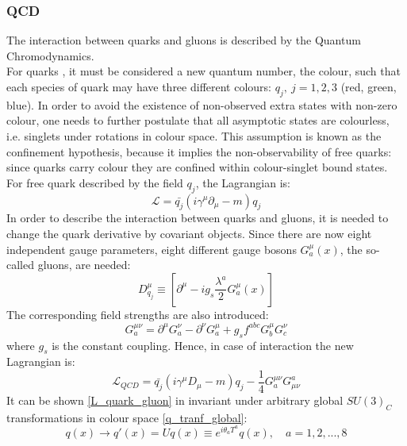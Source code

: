 \subsubsection{QCD}\label{QCD}
The interaction between quarks and gluons is described by the Quantum Chromodynamics. \\
For quarks \cite{QCD}, it must be considered a new quantum number, the colour, such that each species of quark may have three different colours: $q_{j},\ j = 1, 2, 3$ (red, green, blue). In order to avoid the existence of non-observed extra states with non-zero colour, one needs to further postulate that all asymptotic states are colourless, i.e. singlets under rotations in colour space. This assumption is known as the confinement hypothesis, because it implies the non-observability of free quarks: since quarks carry colour they are confined within colour-singlet bound states. \\
For free quark described by the field $q_{j}$, the Lagrangian is:
\begin{equation}
\mathcal{L} = \bar{q_{j}}(i\gamma^{\mu}\partial_{\mu} - m)q_{j}
\label{L_quark}
\end{equation}
In order to describe the  interaction between quarks and gluons, it is needed to change the quark derivative by covariant objects. Since there are now eight independent gauge parameters, eight different gauge bosons $G^{\mu}_{a}(x)$, the so-called gluons, are needed:
\begin{equation}
D^{\mu}_{q_{j}} \equiv [\partial^{\mu}- ig_{s}\frac{\lambda^{a}}{2}G^{\mu}_{a}(x)]
\label{D_covariante_qcd}
\end{equation}
The corresponding field strengths are also introduced:
\begin{equation}
G^{\mu\nu}_{a} = \partial^{\mu}G^{\nu}_{a} - \partial^{\nu}G^{\mu}_{a} + g_{s}f^{abc}G^{\mu}_{b}G^{\nu}_{c}
\label{G_munu}
\end{equation}
where $g_{s}$ is the constant coupling.
Hence, in case of interaction the new Lagrangian is:
\begin{equation}
\mathcal{L}_{QCD} = \bar{q_{j}}(i\gamma^{\mu}D_{\mu} - m)q_{j} -\frac{1}{4}G^{\mu\nu}_{a}G^{a}_{\mu\nu}
\label{L_quark_gluon}
\end{equation}
It can be shown \ref{L_quark_gluon} in invariant under arbitrary global $SU(3)_{C}$ transformations in colour space \ref{q_tranf_global}:
\begin{equation}
q(x) \to q'(x) = Uq(x) \equiv e^{i\theta_{a}T^{a}}q(x), \quad a = 1, 2, ...,8
\label{q_tranf_global}
\end{equation}
